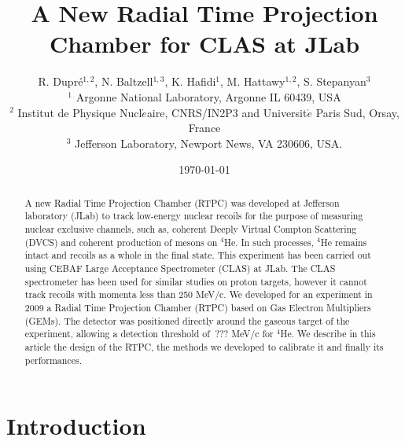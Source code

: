 \documentclass[reprint, amsmath,amssymb, aps]{revtex4}
\begin{document}

\title{\vspace{-15mm}\fontsize{24pt}{10pt}\selectfont\textbf{A New Radial Time Projection Chamber for CLAS at JLab}}
\author{
\Large{R. Dupr\'e$^{1,2}$, N. Baltzell$^{1,3}$, K. Hafidi$^{1}$, M.  
Hattawy$^{1,2}$, S. Stepanyan$^{3}$} \\
\vspace{+5mm}
\normalsize $^{1}$ Argonne National Laboratory, Argonne IL 60439, USA \\
\normalsize $^{2}$ Institut de Physique Nucl$\acute{e}$aire, CNRS/IN2P3 and 
Universit$\acute{e}$ Paris Sud, Orsay, France \\
\normalsize $^{3}$ Jefferson Laboratory, Newport News, VA 230606, USA.
}



\date{\today}%

\vspace{+25mm}
\begin{abstract}
A new Radial Time Projection Chamber (RTPC) was developed at Jefferson 
laboratory (JLab) to track low-energy nuclear recoils for the purpose of 
measuring nuclear exclusive channels, such as, coherent Deeply Virtual Compton 
Scattering (DVCS) and coherent production of mesons on $^4$He. In such 
processes, $^4$He remains intact and recoils as a whole in the final state. 
This experiment has been carried out using CEBAF Large Acceptance Spectrometer 
(CLAS) at JLab. The CLAS spectrometer has been used for similar studies on 
proton targets, however it cannot track recoils with momenta less than 250 
MeV/c.  We developed for an experiment in 2009 a Radial Time Projection Chamber 
(RTPC) based on Gas Electron Multipliers (GEMs).  The detector was positioned 
directly around the gaseous target of the experiment, allowing a detection 
threshold of $~$???  MeV/c for $^4$He. We describe in this article the design 
of the RTPC, the methods we developed to calibrate it and finally its 
performances.
\end{abstract}

\maketitle


\section{\label{sec:level1} Introduction}
\end{document}

